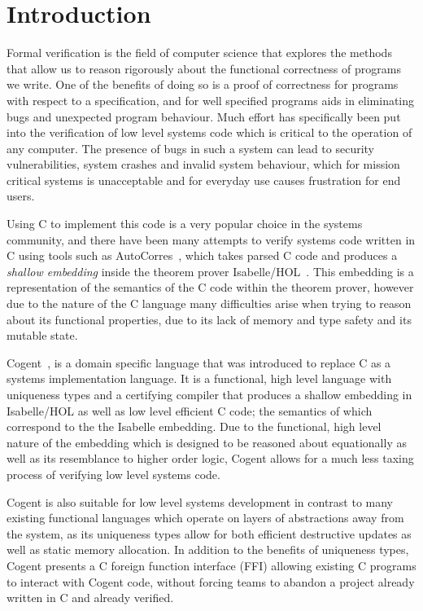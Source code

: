 \chapter{Introduction}\label{ch:intro}

Formal verification is the field of computer science that explores the methods that allow us to
  reason rigorously about the functional correctness of programs we write.
One of the benefits of doing so is a proof of correctness for programs with respect to a specification,
  and for well specified programs aids in eliminating bugs and unexpected program behaviour. 
Much effort has specifically been put into the verification of low level systems code
  which is critical to the operation of any computer.
The presence of bugs in such a system can lead to security vulnerabilities,
  system crashes and invalid system behaviour, which for mission critical systems is unacceptable and
  for everyday use causes frustration for end users.

Using C to implement this code is a very popular choice in the systems community,
  and there have been many attempts to verify systems code written in C using tools such as 
  AutoCorres~\citep{AutoCorres}, which takes parsed C code and produces a \textit{shallow embedding}
  inside the theorem prover Isabelle/HOL~\cite{IsabelleTutorial}.
This embedding is a representation of the semantics of the C code within the theorem prover,
  however due to the nature of the C language many difficulties arise when trying to
  reason about its functional properties, due to its lack of memory and type safety 
  and its mutable state.

Cogent~\citep{ICFPCogent}, is a domain specific language that was introduced to replace C as a systems
  implementation language.
It is a functional, high level language with uniqueness types and a certifying compiler
  that produces a shallow embedding in Isabelle/HOL as well as low level efficient C code;
  the semantics of which correspond to the the Isabelle embedding.
Due to the functional, high level nature of the embedding 
  which is designed to be reasoned about equationally as well as its resemblance to higher order logic,
  Cogent allows for a much less taxing process of verifying low level systems code.

Cogent is also suitable for low level systems development in contrast to many existing functional languages which operate
  on layers of abstractions away from the system, as its uniqueness types allow for both efficient destructive updates
  as well as static memory allocation.
In addition to the benefits of uniqueness types, Cogent presents a C foreign function interface (FFI) allowing existing C programs
 to interact with Cogent code, without forcing teams to abandon a project already written in C and already verified.


